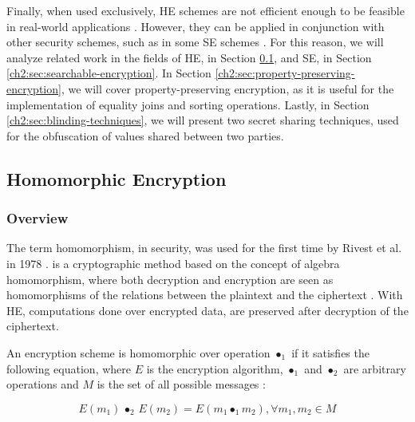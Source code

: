 Finally, when used exclusively, \gls{HE} \autocite{Acar2018-mp, Fontaine2007-sv} schemes are not efficient enough to be feasible in real-world applications \autocite{Bosch2014-eb}. However, they can be applied in conjunction with other security schemes, such as in some \gls{SE} schemes \autocite{Bosch2014-eb, Chase2010-xx}. For this reason, we will analyze related work in the fields of \gls{HE}, in Section \ref{ch2:sec:homomorphic-encryption}, and \gls{SE}, in Section \ref{ch2:sec:searchable-encryption}. In Section \ref{ch2:sec:property-preserving-encryption}, we will cover property-preserving encryption, as it is useful for the implementation of equality joins and sorting operations. Lastly, in Section \ref{ch2:sec:blinding-techniques}, we will present two secret sharing techniques, used for the obfuscation of values shared between two parties.


\subsection{Homomorphic Encryption}
\label{ch2:sec:homomorphic-encryption}

\subsubsection{Overview}

The term homomorphism, in security, was used for the first time by Rivest et al. in 1978 \autocite{Rivest1978-vt}.
 is a cryptographic method based on the concept of algebra homomorphism, where both decryption and encryption are seen as homomorphisms of the relations between the plaintext and the ciphertext \autocite{Acar2018-mp, Fontaine2007-sv}. With \gls{HE}, computations done over encrypted data, are preserved after decryption of the ciphertext. 

\begin{definition}\label{ch2:definition:he}
    An encryption scheme is homomorphic over operation $\bullet_1$ if it satisfies the following equation, where $E$ is the encryption algorithm, $\bullet_1$ and $\bullet_2$ are arbitrary operations and $M$ is the set of all possible messages \autocite{Acar2018-mp, Franz2011-sm}: 

\begin{equation}\label{ch2:sec:homomorphic-encryption:def-eq}
    E(m_{1}) \, \bullet_2 \, E(m_{2}) = E(m_{1} \bullet_1 m_{2}), \forall m_{1}, m_{2} \in M
\end{equation}

\end{definition}

